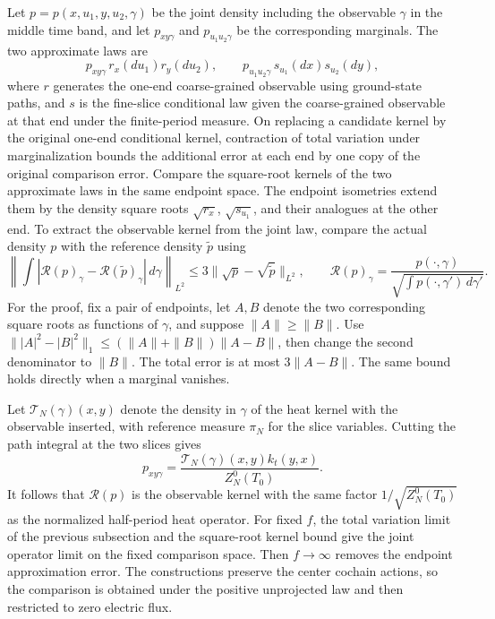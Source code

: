 \documentclass[11pt,a4paper]{article}
\numberwithin{equation}{section}
\begin{document}
Let \(p=p(x,u_1,y,u_2,\gamma)\) be the joint density including the observable \(\gamma\) in the middle time band, and let \(p_{xy\gamma}\) and \(p_{u_1u_2\gamma}\) be the corresponding marginals. The two approximate laws are
\[
    p_{xy\gamma}\,r_x(du_1)r_y(du_2),
   \qquad
    p_{u_1u_2\gamma}\,s_{u_1}(dx)s_{u_2}(dy),
\]
where \(r\) generates the one-end coarse-grained observable using ground-state paths, and \(s\) is the fine-slice conditional law given the coarse-grained observable at that end under the finite-period measure. On replacing a candidate kernel by the original one-end conditional kernel, contraction of total variation under marginalization bounds the additional error at each end by one copy of the original comparison error. Compare the square-root kernels of the two approximate laws in the same endpoint space. The endpoint isometries extend them by the density square roots \(\sqrt{r_x}\), \(\sqrt{s_{u_1}}\), and their analogues at the other end. To extract the observable kernel from the joint law, compare the actual density \(p\) with the reference density \(\widetilde p\) using
\[
 \left\|\int|\mathcal R(p)_\gamma-\mathcal R(\widetilde p)_\gamma|\,d\gamma\right\|_{L^2}
       \leq3\|\sqrt p-\sqrt{\widetilde p}\|_{L^2},\qquad
 \mathcal R(p)_\gamma=\frac{p(\cdot,\gamma)}{\sqrt{\int p(\cdot,\gamma')\,d\gamma'}} .
\]
For the proof, fix a pair of endpoints, let \(A,B\) denote the two corresponding square roots as functions of \(\gamma\), and suppose \(\|A\|\geq\|B\|\). Use \(\||A|^2-|B|^2\|_1\leq(\|A\|+\|B\|)\|A-B\|\), then change the second denominator to \(\|B\|\). The total error is at most \(3\|A-B\|\). The same bound holds directly when a marginal vanishes.

Let \(\mathcal T_N(\gamma)(x,y)\) denote the density in \(\gamma\) of the heat kernel with the observable inserted, with reference measure \(\pi_N\) for the slice variables. Cutting the path integral at the two slices gives
\[
 p_{xy\gamma}=\frac{\mathcal T_N(\gamma)(x,y)k_t(y,x)}{Z_N^0(T_0)}.
\]
It follows that \(\mathcal R(p)\) is the observable kernel with the same factor \(1/\sqrt{Z_N^0(T_0)}\) as the normalized half-period heat operator. For fixed \(f\), the total variation limit of the previous subsection and the square-root kernel bound give the joint operator limit on the fixed comparison space. Then \(f\to\infty\) removes the endpoint approximation error. The constructions preserve the center cochain actions, so the comparison is obtained under the positive unprojected law and then restricted to zero electric flux.
\end{document}
